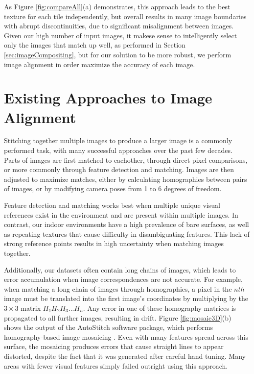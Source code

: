 \documentclass[]{spie}  %
\begin{document}
As Figure \ref{fig:compareAll}(a) demonstrates, this approach leads to
the best texture for each tile independently, but overall results in
many image boundaries with abrupt discontinuities, due to significant
misalignment between images. Given our high number of input images, it
makese sense to intelligently select only the images that match up
well, as performed in Section \ref{sec:imageCompositing}, but for our
solution to be more robust, we perform image alignment in order
maximize the accuracy of each image.

\section{Existing Approaches to Image Alignment}
\label{sec:existingApproaches}
Stitching together multiple images to produce a larger image is a
commonly performed task, with many successful approaches over the past
few decades. Parts of images are first matched to eachother, through
direct pixel comparisons, or more commonly through feature detection
and matching. Images are then adjusted to maximize matches, either by
calculating homographies between pairs of images, or by
modifying camera poses from 1 to 6 degrees of freedom.

Feature detection and matching works best when multiple unique visual
references exist in the environment and are present within multiple
images. In contrast, our indoor environments have a high
prevalence of bare surfaces, as well as repeating textures that cause
difficulty in disambiguating features. This lack of strong reference
points results in high uncertainty when matching images together.

Additionally, our datasets often contain long chains of images, which
leads to error accumulation when image correspondences are not
accurate. For example, when matching a long chain of images through
homographies, a pixel in the $nth$ image must be translated into the
first image's coordinates by multiplying by the $3\times3$ matrix $H_1
H_2 H_3 ... H_n$. Any error in one of these homography matrices is
propagated to all further images, resulting in drift. Figure
\ref{fig:mosaic3D}(b) shows the output of the AutoStitch software
package, which performs homography-based image mosaicing
\cite{autostitch}. Even with many features spread across this surface,
the mosaicing produces errors that cause straight lines to appear distorted, despite the fact that it was generated after careful hand
tuning. Many areas with fewer visual features simply failed outright
using this approach.
\end{document}
